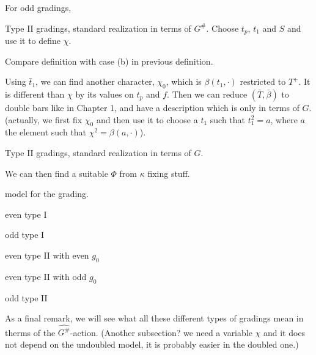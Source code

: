 For odd gradings, 

\begin{defi}
    Type II gradings, standard realization in terms of $G^\#$. 
    Choose $t_p$, $t_1$ and $S$ and use it to define $\chi$. 
\end{defi}

Compare definition with case (b) in previous definition. 

Using $\bar t_1$, we can find another character, $\chi_0$, which is $\beta( t_1, \cdot)$ restricted to $T^+$. 
It is different than $\chi$ by its values on $t_p$ and $f$. 
Then we can reduce $(\bar T, \bar \beta)$ to double bars like in Chapter 1, and have a description which is only in terms of $G$. 
(actually, we first fix $\chi_0$ and then use it to choose a $t_1$ such that $t_1^2 = a$, where $a$ the element such that $\chi^2 = \beta(a, \cdot)$).

\begin{defi}
    Type II gradings, standard realization in terms of $G$. 
\end{defi}

We can then find a suitable $\Phi$ from $\kappa$ fixing stuff.

\begin{defi}
    model for the grading.
\end{defi}

\begin{thm}
    \mbox{}
    
    
        even type I
        
    
        odd type I
        
    
        even type II with even $g_0$
        
    
        even type II with odd $g_0$
        
    
        odd type II
\end{thm}

As a final remark, we will see what all these different types of gradings mean in therms of the $\widehat{G^\#}$-action. 
(Another subsection? we need a variable $\chi$ and it does not depend on the undoubled model, it is probably easier in the doubled one.)